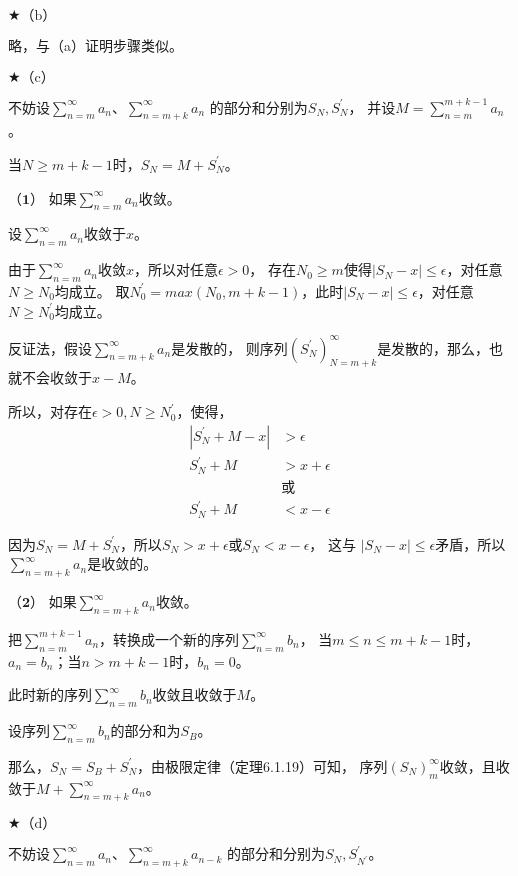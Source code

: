 \documentclass{article}
\theoremstyle{mystyle}
\begin{document}
$\bigstar \text{（b）}$

略，与（a）证明步骤类似。

$\bigstar \text{（c）}$

不妨设$\sum \limits_{n=m} ^{\infty} a_n$、$\sum \limits_{n=m+k} ^{\infty} a_n$
的部分和分别为$S_N, S_N^\prime$，
并设$M = \sum \limits_{n=m} ^{m+k-1} a_n$。

当$N \geq m+k-1$时，$S_N = M + S_N^\prime$。

$\textbf{（1）}$ 如果$\sum \limits_{n=m} ^{\infty} a_n$收敛。

设$\sum \limits_{n=m} ^{\infty} a_n$收敛于$x$。


由于$\sum \limits_{n=m} ^{\infty} a_n$收敛$x$，所以对任意$\epsilon > 0$，
存在$N_0 \geq m$使得$|S_N - x| \leq \epsilon$，对任意$N \geq N_0$均成立。
取$N_0^\prime = max(N_0, m+k-1)$，此时$|S_N - x| \leq \epsilon$，对任意$N \geq N_0^\prime$均成立。

反证法，假设$\sum \limits_{n=m+k} ^{\infty} a_n$是发散的，
则序列$(S_N^\prime)_{N=m+k}^\infty$是发散的，那么，也就不会收敛于$x-M$。

所以，对存在$\epsilon > 0, N \geq N_0^\prime$，使得，
\begin{align*}
  |S_N^\prime + M - x| & > \epsilon     \\
  S_N^\prime + M       & > x + \epsilon \\
                       & \textbf{或}     \\
  S_N^\prime + M       & < x - \epsilon
\end{align*}

因为$S_N = M + S_N^\prime$，所以$S_N > x + \epsilon$或$S_N < x - \epsilon$，
这与 $|S_N - x| \leq \epsilon$矛盾，所以$\sum \limits_{n=m+k} ^{\infty} a_n$是收敛的。

$\textbf{（2）}$ 如果$\sum \limits_{n=m+k} ^{\infty} a_n$收敛。

把$\sum \limits_{n=m} ^{m+k-1} a_n$，转换成一个新的序列$\sum \limits_{n=m} ^{\infty} b_n$，
当$m \leq n \leq m + k - 1$时，$a_n = b_n$；当$n>m + k - 1$时，$b_n = 0$。

此时新的序列$\sum \limits_{n=m} ^{\infty} b_n$收敛且收敛于$M$。

设序列$\sum \limits_{n=m} ^{\infty} b_n$的部分和为$S_B$。

那么，$S_N = S_B + S_N^\prime$，由极限定律（定理6.1.19）可知，
序列$(S_N)_m^\infty$收敛，且收敛于$M + \sum \limits_{n=m+k} ^{\infty} a_n$。

$\bigstar \text{（d）}$

不妨设$\sum \limits_{n=m} ^{\infty} a_n$、$\sum \limits_{n=m+k} ^{\infty} a_{n-k}$
的部分和分别为$S_N, S_{N^\prime}^\prime$。
\end{document}
